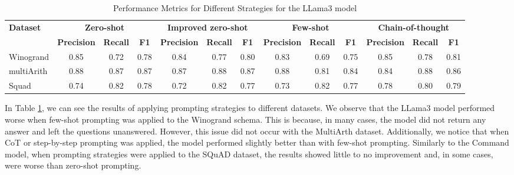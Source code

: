 \documentclass[fleqn,moreauthors,10pt]{ds_report}
\begin{document}
\begin{table}[!htbp]
\centering
\begin{adjustbox}{width=\columnwidth}
\begin{tabular}{@{}lcccccccccccc@{}}
\toprule
\textbf{Dataset} & \multicolumn{3}{c}{\textbf{Zero-shot}} & \multicolumn{3}{c}{\textbf{Improved zero-shot}} & \multicolumn{3}{c}{\textbf{Few-shot}} & \multicolumn{3}{c}{\textbf{Chain-of-thought}} \\
 & \textbf{Precision} & \textbf{Recall} & \textbf{F1} & \textbf{Precision} & \textbf{Recall} & \textbf{F1} & \textbf{Precision} & \textbf{Recall} & \textbf{F1} & \textbf{Precision} & \textbf{Recall} & \textbf{F1} \\ \midrule
Winogrand & 0.85 & 0.72 & 0.78 & 0.84 & 0.77 & 0.80 & 0.83 & 0.69 & 0.75 & 0.85 & 0.78 & 0.81 \\
multiArith & 0.88 &  0.87 & 0.87 & 0.87 & 0.88 & 0.87 & 0.88 & 0.81 & 0.84 & 0.84 & 0.88 & 0.86 \\
Squad & 0.74 &  0.82 & 0.78 & 0.72 & 0.82 & 0.77 & 0.73 & 0.82 & 0.77 & 0.78 & 0.80 & 0.79 \\  \bottomrule
\end{tabular}
\end{adjustbox}
\caption{Performance Metrics for Different Strategies for the LLama3 model}
\label{tab:performance_metrics_llama}
\end{table}

In Table \ref{tab:performance_metrics_llama}, we can see the results of applying prompting strategies to different datasets. We observe that the LLama3 model performed worse when few-shot prompting was applied to the Winogrand schema. This is because, in many cases, the model did not return any answer and left the questions unanswered. However, this issue did not occur with the MultiArth dataset. Additionally, we notice that when CoT or step-by-step prompting was applied, the model performed slightly better than with few-shot prompting. Similarly to the Command model, when prompting strategies were applied to the SQuAD dataset, the results showed little to no improvement and, in some cases, were worse than zero-shot prompting.



\end{document}
